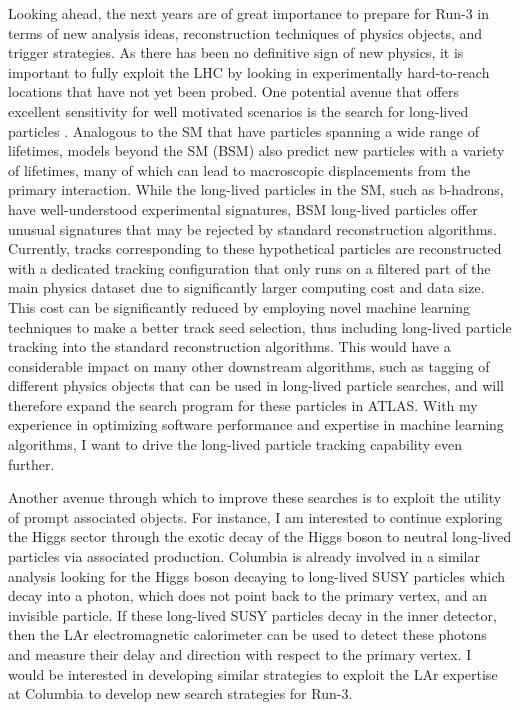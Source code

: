 \documentclass[a4paper]{article}
\begin{document}
Looking ahead, the next years are of great importance to prepare for Run-3 in terms of new analysis ideas, reconstruction techniques of physics objects, and trigger strategies. As there has been no definitive sign of new physics,
it is important to fully exploit the LHC by looking in experimentally hard-to-reach locations that have not yet been probed.
One potential avenue that offers excellent sensitivity for well motivated scenarios is the search for long-lived particles
\cite{alimena2019searching}.
Analogous to the SM that have particles spanning a wide range of lifetimes, models beyond the SM (BSM) also predict new particles
with a variety of lifetimes, many of which can lead to macroscopic displacements from the primary interaction.
While the long-lived particles in the SM, such as b-hadrons, have well-understood experimental signatures, BSM long-lived particles
offer unusual signatures that may be rejected by standard reconstruction algorithms.
Currently, tracks corresponding to these hypothetical particles are reconstructed with a dedicated tracking configuration that only runs
on a filtered part of the main physics dataset due to significantly larger computing cost and data size. This cost can be significantly reduced
by employing novel machine learning techniques to make a better track seed selection, thus including long-lived particle tracking
into the standard reconstruction algorithms. This would have a considerable impact on many other downstream algorithms, such as tagging of different
physics objects that can be used in long-lived particle searches, and will therefore expand the search program for these particles in ATLAS.
With my experience in optimizing software performance and expertise in machine learning algorithms,
I want to drive the long-lived particle tracking capability even further.

Another avenue through which to improve these searches is to exploit the utility of prompt associated objects.
For instance, I am interested to continue exploring the Higgs sector through the exotic decay of the Higgs boson to neutral long-lived particles
via associated production. Columbia is already involved in a similar analysis looking for the Higgs boson
decaying to long-lived SUSY particles which decay into a photon, which does not point back to the primary vertex, and an invisible particle. If these long-lived SUSY particles decay in the inner detector, then the LAr electromagnetic calorimeter can be used to detect these photons and measure
their delay and direction with respect to the primary vertex.
I would be interested in developing similar strategies to exploit the LAr expertise at Columbia to develop new search strategies for Run-3.
\end{document}
